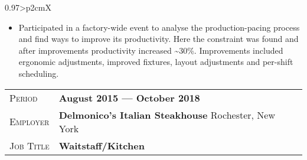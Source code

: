 \documentclass[a4paper, oneside, final]{scrartcl} %
\newcommand{\gray}{\rowcolor[gray]{.90}} %
\begin{document}
\begin{center}
\begin{tabularx}{0.97\linewidth}{>{\raggedleft\scshape}p{2cm}X}
{\begin{itemize}
            \begin{itemize}
                \item Participated in a factory-wide event to analyse the production-pacing process and find ways to improve its productivity. 
                Here the constraint was found and after improvements productivity increased \textasciitilde30\%{}. 
                Improvements included ergonomic adjustments, improved fixtures, layout adjustments and per-shift scheduling.
            \end{itemize}
        \end{itemize}
    }
    \vspace{-10pt}
\end{tabularx}


\begin{tabularx}{0.97\linewidth}{>{\raggedleft\scshape}p{2cm}X}
    \gray Period & \textbf{August 2015 --- October 2018}\\
    \gray Employer & \textbf{Delmonico's Italian Steakhouse} \hfill Rochester, New York\\
    \gray Job Title & \textbf{Waitstaff/Kitchen}\\
\end{tabularx}





\end{center}
\end{document}
